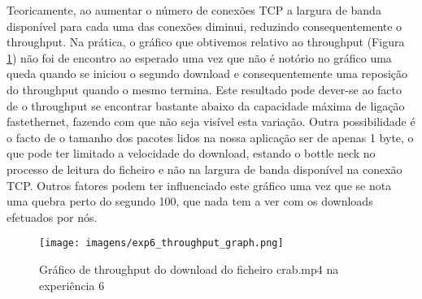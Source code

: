Teoricamente, ao aumentar o número de conexões TCP a largura de banda disponível para cada uma das conexões diminui, reduzindo consequentemente o throughput. Na prática, o gráfico que obtivemos relativo ao throughput (Figura \ref{fig:exp6_throughput_graph}) não foi de encontro ao esperado uma vez que não é notório no gráfico uma queda quando se iniciou o segundo download e consequentemente uma reposição do throughput quando o mesmo termina. Este resultado pode dever-se ao facto de o throughput se encontrar bastante abaixo da capacidade máxima de ligação fastethernet, fazendo com que não seja visível esta variação. Outra possibilidade é o facto de o tamanho dos pacotes lidos na nossa aplicação ser de apenas 1 byte, o que pode ter limitado a velocidade do download, estando o bottle neck no processo de leitura do ficheiro e não na largura de banda disponível na conexão TCP. Outros fatores podem ter influenciado este gráfico uma vez que se nota uma quebra perto do segundo 100, que nada tem a ver com os downloads efetuados por nós.

\begin{figure}[h!]
\centering
\texttt{[image: imagens/exp6\_throughput\_graph.png]}
\caption{Gráfico de throughput do download do ficheiro crab.mp4 na experiência 6}
\label{fig:exp6_throughput_graph}
\end{figure}